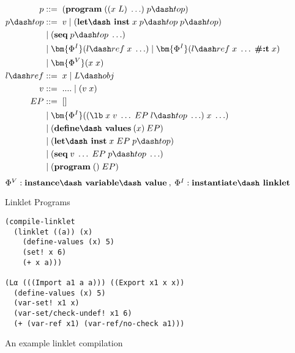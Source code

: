 \begin{figure}[h]
  \begin{mdframed}
    \begin{align*}
      p           &::=\; (\textbf{program}\; ((x\; L)\; \ldots)\; p\dash top) \\
      p\dash top  &::=\; v\; |\; (\textbf{let\dash inst}\; x\; p\dash top\;p\dash top) \\
      \;          &\;|\; (\textbf{seq}\; p\dash top\; \ldots) \\
      \;          &\;|\; \bm{\Phi^I}(l\dash ref\; x\; \ldots)\; |\; \bm{\Phi^I}(l\dash ref\; x\; \ldots\; \textbf{\#:t}\; x) \\
      \;          &\;|\; \bm{\Phi^V}(x\; x) \\
      l\dash ref &::=\; x\; |\; L\dash obj \\
      v           &::=\; ....\;|\;(v\;x) \\
      EP          &::=\; [] \\
      \;          &\;|\; \bm{\Phi^I}((\lb\; x\; v\; \ldots\; EP\; l\dash top\; \ldots)\; x\; \ldots) \\
      \;          &\;|\; (\textbf{define\dash values}\:(x)\:EP) \\
      \;          &\;|\; (\textbf{let\dash inst}\; x\; EP\; p\dash top) \\
      \;          &\;|\; (\textbf{seq}\; v\; \ldots\; EP\; p\dash top\; \ldots) \\
      \;          &\;|\; (\textbf{program}\; ()\; EP) \\
    \end{align*}
    \hfill \footnotesize $\Phi^V : \textbf{instance\dash variable\dash value}\:,\: \Phi^I : \textbf{instantiate\dash linklet}$
    \caption{Linklet Programs}
    \label{fig:linklet-program}
  \end{mdframed}
\end{figure}

\begin{figure}[h]
  \begin{mdframed}
\begin{verbatim}
(compile-linklet
  (linklet ((a)) (x)
    (define-values (x) 5)
    (set! x 6)
    (+ x a)))

(Lα (((Import a1 a a))) ((Export x1 x x))
  (define-values (x) 5)
  (var-set! x1 x)
  (var-set/check-undef! x1 6)
  (+ (var-ref x1) (var-ref/no-check a1)))
\end{verbatim}
\caption{An example linklet compilation}
\label{fig:compile-example}
\end{mdframed}
\end{figure}


